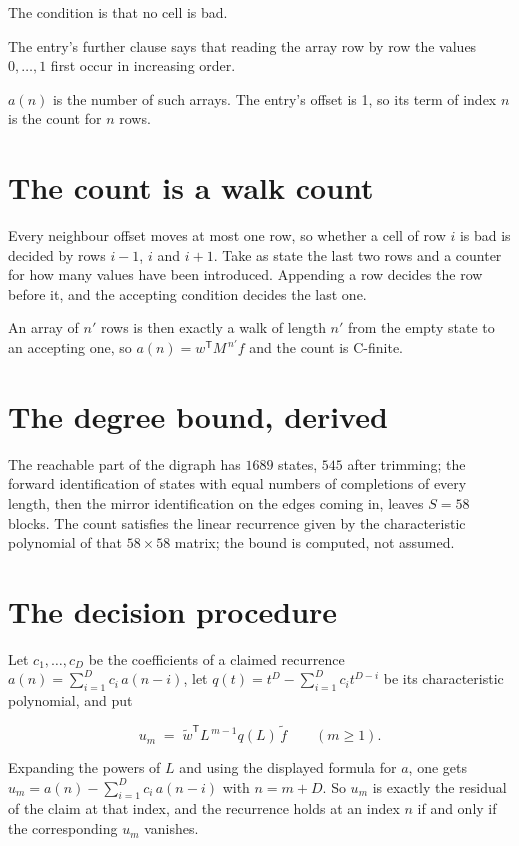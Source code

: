 \documentclass[11pt]{article}
\theoremstyle{definition}
\begin{document}
The condition is that no cell is bad.

The entry's further clause says that reading the array row by row the values $0,\dots,1$ first occur in increasing order.

$a(n)$ is the number of such arrays. The entry's offset is 1, so its term of index $n$ is the count for $n$ rows.

\section{The count is a walk count}

Every neighbour offset moves at most one row, so whether a cell of row $i$ is bad is decided by rows $i-1$, $i$ and $i+1$. Take as state the last two rows and a counter for how many values have been introduced. Appending a row decides the row before it, and the accepting condition decides the last one.

An array of $n'$ rows is then exactly a walk of length $n'$ from the empty state to an accepting one, so $a(n) = w^{\mathsf T}M^{\,n'}f$ and the count is C-finite.

\section{The degree bound, derived}

The reachable part of the digraph has $1689$ states, $545$ after trimming; the forward identification of states with equal numbers of completions of every length, then the mirror identification on the edges coming in, leaves $S = 58$ blocks. The count satisfies the linear recurrence given by the characteristic polynomial of that $58\times58$ matrix; the bound is computed, not assumed.

\section{The decision procedure}

Let $c_1,\dots,c_D$ be the coefficients of a claimed recurrence $a(n) = \sum_{i=1}^{D} c_i\,a(n-i)$, let $q(t) = t^{D} - \sum_{i=1}^{D} c_i t^{D-i}$ be its characteristic polynomial, and put

\[u_m \;=\; \tilde w^{\mathsf T} L^{\,m-1} q(L)\,\tilde f \qquad (m \ge 1).\]

Expanding the powers of $L$ and using the displayed formula for $a$, one gets $u_m = a(n) - \sum_{i=1}^{D} c_i\,a(n-i)$ with $n = m + D$. So $u_m$ is exactly the residual of the claim at that index, and the recurrence holds at an index $n$ if and only if the corresponding $u_m$ vanishes.
\end{document}
